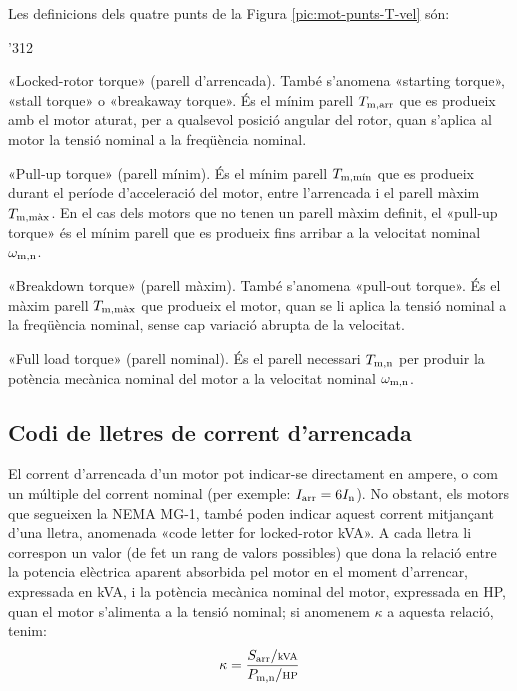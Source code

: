 Les definicions dels quatre punts de la Figura  \vref{pic:mot-punts-T-vel} són:
\begin{dingautolist}{'312}
   \item «Locked-rotor torque» (parell d'arrencada). També s'anomena «starting torque», «stall torque» o «breakaway torque». És el mínim parell $T\ped{m,arr}$ que es produeix amb el motor aturat, per a qualsevol posició angular del rotor, quan s'aplica al motor la tensió nominal a la freqüència nominal.
   \item «Pull-up torque» (parell mínim). És el mínim parell $T\ped{m,\text{mín}}$ que es produeix durant el període d'acceleració del motor, entre l'arrencada  i el parell màxim $T\ped{m,\text{màx}}$. En el cas dels motors que no tenen un parell màxim definit, el «pull-up torque» és el mínim parell que es produeix fins arribar a la velocitat nominal $\omega\ped{m,n}$.
   \item «Breakdown torque» (parell màxim). També s'anomena «pull-out torque». És el màxim parell $T\ped{m,\text{màx}}$ que  produeix  el motor, quan se li aplica  la tensió nominal a la freqüència nominal, sense cap variació abrupta de la velocitat.
   \item «Full load torque» (parell nominal). És el parell necessari $T\ped{m,n}$ per produir la potència mecànica nominal del motor a la velocitat nominal  $\omega\ped{m,n}$.
\end{dingautolist}


\subsection{Codi de lletres de corrent d'arrencada}

El corrent d'arrencada d'un motor pot indicar-se directament en ampere, o com un múltiple del corrent nominal (per exemple: $I\ped{arr} = 6 I\ped{n}$). No obstant, els motors que segueixen la NEMA MG-1, també poden indicar aquest corrent mitjançant d'una lletra, anomenada «code letter for locked-rotor kVA». A cada lletra li correspon un valor (de fet un rang de valors possibles) que dona la relació entre la potencia elèctrica aparent absorbida pel motor en el moment d'arrencar, expressada en kVA, i la potència mecànica nominal del motor, expressada en HP, quan el motor s'alimenta a la tensió nominal; si anomenem $\kappa$ a aquesta relació, tenim:
\begin{equation}
    \kappa = \frac{S\ped{arr}/{\scriptstyle\si{kVA}}}{P\ped{m,n}/{\scriptstyle \si{HP}}}
\end{equation}

